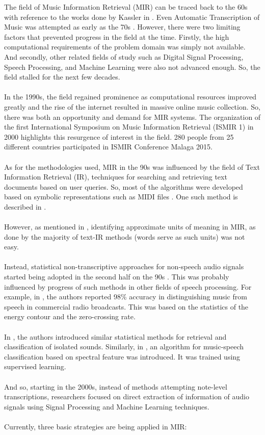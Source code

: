 The field of Music Information Retrieval (MIR) can be traced back to the 60s with reference to the works done by Kassler in \cite{kassler1966}.
Even Automatic Transcription of Music was attempted as early as the 70s \cite{andel1975}. However, there were two limiting factors that prevented progress in the field at the time.
Firstly, the high computational requirements of the problem domain was simply not available. 
And secondly, other related fields of study such as Digital Signal Processing, Speech Processing, and Machine Learning were also not advanced enough.  
So, the field stalled for the next few decades.\\
\\
In the 1990s, the field regained prominence as computational resources improved greatly and the rise of the internet resulted in massive online music collection. So, there was both an opportunity and demand for MIR systems.
The organization of the first International Symposium on Music Information Retrieval (ISMIR 1) in 2000 highlights this resurgence of interest in the field. 
280 people from 25 different countries participated in ISMIR Conference Malaga 2015.\\
\\
As for the methodologies used, MIR in the 90s was influenced by the field of Text Information Retrieval (IR), techniques for searching and retrieving text documents based on user queries.
So, most of the algorithms were developed based on symbolic representations such as MIDI files \cite{Tzanetakis2002a}. One such method is described in \cite{alghoniemy1999}.\\
\\
However, as mentioned in \cite{byrd2002}, identifying approximate units of meaning in MIR, as done by the majority of text-IR methods (words serve as such units) was not easy.\\
\\
Instead, statistical non-transcriptive approaches for non-speech audio signals started being adopted in the second half on the 90s \cite{Tzanetakis2002a}.
This was probably influenced by progress of such methods in other fields of speech processing. 
For example, in \cite{saunders1996}, the authors reported 98\% accuracy in distinguishing music from speech in commercial radio broadcasts.
This was based on the statistics of the energy contour and the zero-crossing rate.\\
\\
In \cite{wold1996}, the authors introduced similar statistical methods for retrieval and classification of isolated sounds.
Similarly, in \cite{scheirer1997}, an algorithm for music-speech classification based on spectral feature was introduced. 
It was trained using supervised learning. \\
\\
And so, starting in the 2000s, instead of methods attempting note-level transcriptions, researchers focused on direct extraction of information of audio signals using Signal Processing and Machine Learning techniques.\\
\\
Currently, three basic strategies are being applied in MIR: \cite{Casey2008}

